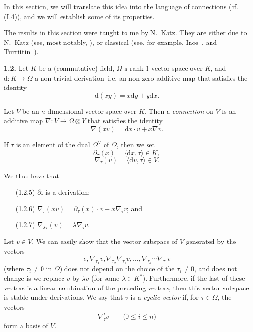 \documentclass{report}
\newenvironment{rmenv}[1]
  {\phantomsection\par\medskip\noindent\textbf{#1.}\rmfamily}
  {\medskip}
\newcommand{\dd}{\mathrm{d}}
\renewcommand{\leq}{\leqslant}
\newcommand{\oldpage}[1]{\marginpar{\footnotesize$\Big\vert$ \textit{p.~#1}}}
\begin{document}
In this section, we will translate this idea into the language of connections (cf. \hyperref[I.4]{(I.4)}), and we will establish some of its properties.

The results in this section were taught to me by N.~Katz.
They are either due to N.~Katz (see, most notably, \cite{14,15}), or classical (see, for example, Ince~\cite{13}, and Turrittin~\cite{25,26}).

\begin{rmenv}{1.2}
\label{II.1.2}
  Let $K$ be a (commutative) field, $\Omega$ a rank-$1$ vector space over $K$, and $\dd\colon K\to\Omega$ a non-trivial derivation, i.e. an non-zero additive map that satisfies the identity
  \[
  \label{II.1.2.1}
    \dd(xy) = x\dd y + y\dd x.
  \tag{1.2.1}
  \]

  Let $V$ be an $n$-dimensional vector space over $K$.
  Then a \emph{connection} on $V$ is an additive map $\nabla\colon V\to\Omega\otimes V$ that satisfies the identity
  \[
  \label{II.1.2.2}
    \nabla(xv) = \dd x\cdot v + x\nabla v.
  \tag{1.2.2}
  \]

  If $\tau$ is an element of the dual $\Omega^\vee$ of $\Omega$, then we set
  \[
  \label{II.1.2.3}
    \partial_\tau(x) = \langle\dd x,\tau\rangle \in K,
  \tag{1.2.3}
  \]
  \[
  \label{II.1.2.4}
    \nabla_\tau(v) = \langle\dd v,\tau\rangle \in V.
  \tag{1.2.4}
  \]

\oldpage{42}
  We thus have that
  \begin{enumerate}
    \item[(1.2.5)] \label{II.1.2.5}
      $\partial_\tau$ is a derivation;
    \item[(1.2.6)] \label{II.1.2.6}
      $\nabla_\tau(xv) = \partial_\tau(x)\cdot v + x\nabla_\tau v$; and
    \item[(1.2.7)] \label{II.1.2.7}
      $\nabla_{\lambda\tau}(v) = \lambda\nabla_\tau v$.
  \end{enumerate}

  Let $v\in V$.
  We can easily show that the vector subspace of $V$ generated by the vectors
  \[
    v, \nabla_{\tau_1}v, \nabla_{\tau_2}\nabla_{\tau_1}v, \ldots, \nabla_{\tau_k}\cdots\nabla_{\tau_1} v
  \]
  (where $\tau_i\neq0$ in $\Omega$) does not depend on the choice of the $\tau_i\neq0$, and does not change is we replace $v$ by $\lambda v$ (for some $\lambda\in K^*$).
  Furthermore, if the last of these vectors is a linear combination of the preceding vectors, then this vector subspace is stable under derivations.
  We say that $v$ is a \emph{cyclic vector} if, for $\tau\in\Omega$, the vectors
  \[
    \nabla_\tau^i v
    \qquad\mbox{($0\leq i\leq n$)}
  \]
  form a basis of $V$.
\end{rmenv}
\end{document}

